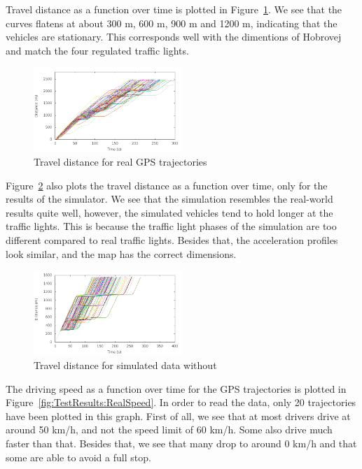 Travel distance as a function over time is plotted in Figure~\ref{fig:TestResults:realDistance}. 
We see that the curves flatens at about 300 m, 600 m, 900 m and 1200 m, indicating that the vehicles are stationary.
This corresponds well with the dimentions of Hobrovej and match the four regulated traffic lights.
\begin{figure}[htb]
\includegraphics[width=0.5\textwidth]{../images/Real/RealDistance.png}
\caption{Travel distance for real GPS trajectories}
\label{fig:TestResults:realDistance}
\end{figure}

Figure~\ref{fig:TestResults:distance0} also plots the travel distance as a function over time, only for the results of the simulator.
We see that the simulation resembles the real-world results quite well, however, the simulated vehicles tend to hold longer at the traffic lights. 
This is because the traffic light phases of the simulation are too different compared to real traffic lights. 
Besides that, the acceleration profiles look similar, and the map has the correct dimensions.

\begin{figure}[htb]
\includegraphics[width=0.5\textwidth]{../images/tp0c1_0/distanceUncontrolled0.png}
\caption{Travel distance for simulated data without \tech}
\label{fig:TestResults:distance0}
\end{figure}

The driving speed as a function over time for the GPS trajectories is plotted in Figure~\ref{fig:TestResults:RealSpeed}.
In order to read the data, only 20 trajectories have been plotted in this graph.
First of all, we see that at most drivers drive at around 50 km/h, and not the speed limit of 60 km/h. 
Some also drive much faster than that.
Besides that, we see that many drop to around 0 km/h and that some are able to avoid a full stop.

